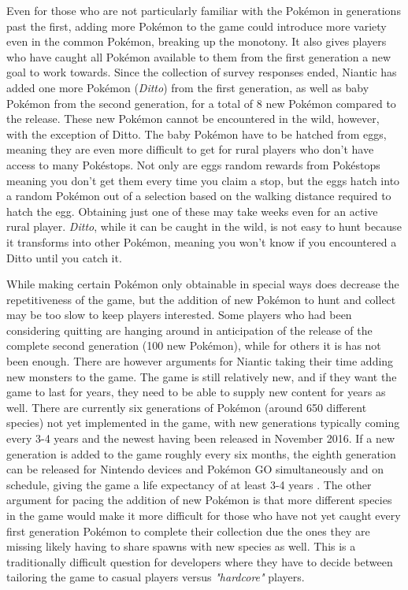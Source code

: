 Even for those who are not particularly familiar with the Pokémon in generations past the first, adding more Pokémon to the game could introduce more variety even in the common Pokémon, breaking up the monotony. It also gives players who have caught all Pokémon available to them from the first generation a new goal to work towards. Since the collection of survey responses ended, Niantic has added one more Pokémon (\emph{Ditto}) from the first generation, as well as baby Pokémon from the second generation, for a total of 8 new Pokémon compared to the release. These new Pokémon cannot be encountered in the wild, however, with the exception of Ditto. The baby Pokémon have to be hatched from eggs, meaning they are even more difficult to get for rural players who don't have access to many Pokéstops. Not only are eggs random rewards from Pokéstops meaning you don't get them every time you claim a stop, but the eggs hatch into a random Pokémon out of a selection based on the walking distance required to hatch the egg. Obtaining just one of these may take weeks even for an active rural player. \emph{Ditto}, while it can be caught in the wild, is not easy to hunt because it transforms into other Pokémon, meaning you won't know if you encountered a Ditto until you catch it.

While making certain Pokémon only obtainable in special ways does decrease the repetitiveness of the game, but the addition of new Pokémon to hunt and collect may be too slow to keep players interested. Some players who had been considering quitting are hanging around in anticipation of the release of the complete second generation (100 new Pokémon), while for others it is has not been enough. There are however arguments for Niantic taking their time adding new monsters to the game. The game is still relatively new, and if they want the game to last for years, they need to be able to supply new content for years as well. There are currently six generations of Pokémon (around 650 different species) not yet implemented in the game, with new generations typically coming every 3-4 years and the newest having been released in November 2016. If a new generation is added to the game roughly every six months, the eighth generation can be released for Nintendo devices and Pokémon GO simultaneously and on schedule, giving the game a life expectancy of at least 3-4 years . The other argument for pacing the addition of new Pokémon is that more different species in the game would make it more difficult for those who have not yet caught every first generation Pokémon to complete their collection due the ones they are missing likely having to share spawns with new species as well. This is a traditionally difficult question for developers where they have to decide between tailoring the game to casual players versus \emph{"hardcore"} players.

